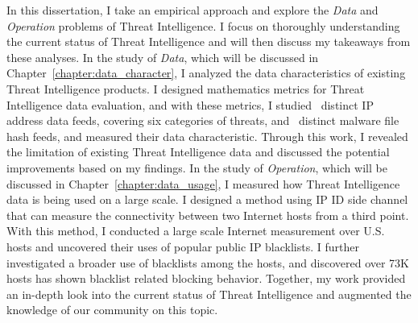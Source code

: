 \begin{dissertationintroduction}
In this dissertation, I take an empirical approach and explore the 
\textit{Data} and \textit{Operation} problems of Threat Intelligence.
I focus on thoroughly understanding the current status of Threat 
Intelligence and will then discuss my takeaways from these analyses.
In the study of \textit{Data}, which will be discussed in Chapter~\ref{chapter:data_character}, 
I analyzed the data characteristics of existing Threat Intelligence products.
I designed mathematics metrics for Threat Intelligence data evaluation,
and with these metrics, I studied \numipfeeds\ distinct IP address 
data feeds, covering six categories of threats, and \numhashfeeds\ distinct
malware file hash feeds, and measured their data characteristic. Through this
work, I revealed the limitation of existing Threat Intelligence data and 
discussed the potential improvements based on my findings. In the study of
\textit{Operation}, which will be discussed in Chapter~\ref{chapter:data_usage},
I measured how Threat Intelligence data is being used on a large scale. 
I designed a method using IP ID side channel that can measure the 
connectivity between two Internet hosts from a third point. With this 
method, I conducted a large scale Internet measurement over {} 
U.S. hosts and uncovered their uses of {\blacklistnum} popular public IP
blacklists. I further investigated a broader use of blacklists among the 
hosts, and discovered over 73K hosts has shown blacklist related blocking 
behavior. Together, my work provided an in-depth look into the current
status of Threat Intelligence and augmented the knowledge of our community
on this topic.

\end{dissertationintroduction}
